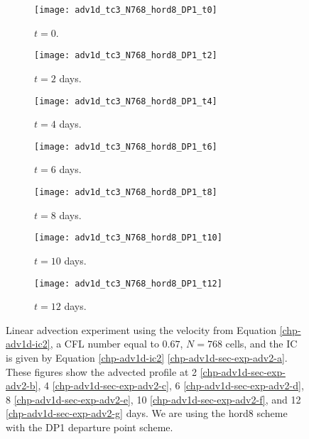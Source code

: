 \begin{figure}[!htb]
	\centering
	\begin{subfigure}{0.3\textwidth}
		\centering
		\texttt{[image: adv1d\_tc3\_N768\_hord8\_DP1\_t0]}
		\caption{$t=0$.\label{chp-adv1d-sec-exp-adv2-a}}
	\end{subfigure}
	\begin{subfigure}{0.3\textwidth}
		\centering
		\texttt{[image: adv1d\_tc3\_N768\_hord8\_DP1\_t2]}
		\caption{$t=2$ days.\label{chp-adv1d-sec-exp-adv2-b}}
	\end{subfigure}
	\begin{subfigure}{0.3\textwidth}
		\centering
		\texttt{[image: adv1d\_tc3\_N768\_hord8\_DP1\_t4]}
		\caption{$t=4$ days.\label{chp-adv1d-sec-exp-adv2-c}}
	\end{subfigure}
	
	\begin{subfigure}{0.3\textwidth}
		\centering
		\texttt{[image: adv1d\_tc3\_N768\_hord8\_DP1\_t6]}
		\caption{$t=6$ days.\label{chp-adv1d-sec-exp-adv2-d}}
	\end{subfigure}
	\begin{subfigure}{0.3\textwidth}
		\centering
		\texttt{[image: adv1d\_tc3\_N768\_hord8\_DP1\_t8]}
		\caption{$t=8$ days.\label{chp-adv1d-sec-exp-adv2-e}}
	\end{subfigure}
	\begin{subfigure}{0.3\textwidth}
		\centering
		\texttt{[image: adv1d\_tc3\_N768\_hord8\_DP1\_t10]}
		\caption{$t=10$ days.\label{chp-adv1d-sec-exp-adv2-f}}
	\end{subfigure}
	\begin{subfigure}{0.3\textwidth}
		\centering
		\texttt{[image: adv1d\_tc3\_N768\_hord8\_DP1\_t12]}
		\caption{$t=12$ days.\label{chp-adv1d-sec-exp-adv2-g}}
	\end{subfigure}
	\caption{Linear advection experiment using the velocity from Equation \eqref{chp-adv1d-ic2},
		a CFL number equal to $0.67$, $N=768$ cells, and the IC is given by 
		Equation \eqref{chp-adv1d-ic2} \eqref{chp-adv1d-sec-exp-adv2-a}.
		These figures show the advected profile at
		2 \eqref{chp-adv1d-sec-exp-adv2-b}, 
		4  \eqref{chp-adv1d-sec-exp-adv2-c},
		6  \eqref{chp-adv1d-sec-exp-adv2-d},
		8  \eqref{chp-adv1d-sec-exp-adv2-e},
		10  \eqref{chp-adv1d-sec-exp-adv2-f},
		and 12  \eqref{chp-adv1d-sec-exp-adv2-g} days.
		We are using the hord8 scheme with the DP1 departure point scheme. \label{chp-adv1d-sec-exp-adv2}}
\end{figure}
